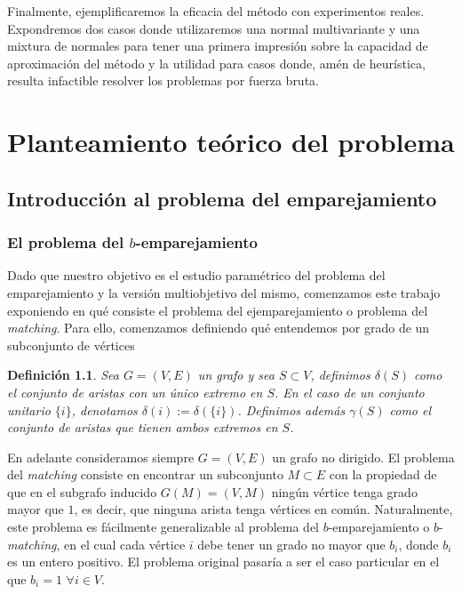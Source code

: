 \documentclass[twoside,a4paper,openright,12pt]{book}
\newtheorem{defi}{Definici\'on}[section]
\begin{document}
Finalmente, ejemplificaremos la eficacia del método con experimentos reales. Expondremos dos casos donde utilizaremos una normal multivariante y una mixtura de normales para tener una primera impresión sobre la capacidad de aproximación del método y la utilidad para casos donde, amén de heurística, resulta infactible resolver los problemas por fuerza bruta.


\newpage
\thispagestyle{empty}
\chapter{Planteamiento teórico del problema}
\section{Introducción al problema del emparejamiento}
\subsection{El problema del $b$-emparejamiento}
Dado que nuestro objetivo es el estudio paramétrico del problema del emparejamiento y la versión multiobjetivo del mismo, comenzamos este trabajo exponiendo en qué consiste el problema del ejemparejamiento o problema del \textit{matching}. Para ello, comenzamos definiendo qué entendemos por grado de un subconjunto de vértices
\begin{defi}
Sea $G=(V,E)$ un grafo y sea $S \subset V$, definimos $\delta(S)$ como el conjunto de aristas con un único extremo en $S$. En el caso de un conjunto unitario $\{i\}$, denotamos $\delta(i):=\delta(\{i\})$. Definimos además $\gamma(S)$ como el conjunto de aristas que tienen ambos extremos en $S$.
\end{defi}

En adelante consideramos siempre $G=(V,E)$ un grafo no dirigido. El problema del \textit{matching} consiste en encontrar un subconjunto $M\subset E$ con la propiedad de que en el subgrafo inducido $G(M)=(V,M)$ ningún vértice tenga grado mayor que $1$, es decir, que ninguna arista tenga vértices en común. Naturalmente, este problema es fácilmente generalizable al problema del $b$-emparejamiento o $b$-\textit{matching}, en el cual cada vértice $i$ debe tener un grado no mayor que $b_i$, donde $b_i$ es un entero positivo. El problema original pasaría a ser el caso particular en el que $b_i = 1$ $\forall i \in V$.
\end{document}
